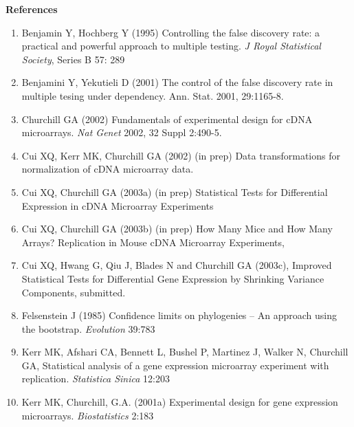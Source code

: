
\newpage
\begin{center}
{\Large\bf References}
\end{center}

\begin{enumerate}

\item Benjamin Y, Hochberg Y (1995) 
Controlling the false discovery rate: a practical and powerful approach to multiple testing. 
\textit{J Royal Statistical Society}, Series B 57: 289

\item Benjamini Y, Yekutieli D (2001)
The control of the false discovery rate in 
multiple tesing under dependency. Ann. Stat. 2001, 29:1165-8.

\item Churchill GA (2002) Fundamentals of experimental design for cDNA microarrays.
\textit{Nat Genet} 2002, 32 Suppl 2:490-5.

\item Cui XQ, Kerr MK, Churchill GA (2002) (in prep)
Data transformations for normalization of cDNA microarray data.

\item Cui XQ, Churchill GA (2003a) (in prep)
Statistical Tests for Differential Expression in cDNA Microarray Experiments

\item Cui XQ, Churchill GA (2003b) (in prep)
How Many Mice and How Many Arrays? 
Replication in Mouse cDNA Microarray Experiments,

\item Cui XQ, Hwang G, Qiu J, Blades N and Churchill GA (2003c), 
Improved Statistical Tests for Differential Gene Expression 
by Shrinking Variance Components, submitted.


\item Felsenstein J (1985) Confidence limits on phylogenies
-- An approach using the bootstrap. \textit{Evolution} 39:783

\item Kerr MK, Afshari CA, Bennett L, Bushel P, Martinez J, 
Walker N, Churchill GA, 
Statistical analysis of a gene expression microarray 
experiment with replication.
\textit{Statistica Sinica} 12:203

\item Kerr MK, Churchill, G.A. (2001a)
Experimental design for gene expression microarrays.
\textit{Biostatistics} 2:183


\end{enumerate}
